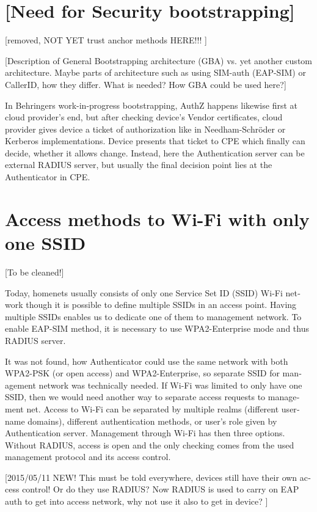 \documentclass[12pt,a4paper,english]{tutthesis}
\begin{document}
\begin{otherlanguage}{english}
\section{[Need for Security bootstrapping]}
\label{sec-4-4}
[removed, NOT YET trust anchor methods HERE!!! ]



[Description of General Bootstrapping architecture (GBA) vs. yet
another custom architecture. Maybe parts of architecture
such as using SIM-auth (EAP-SIM) or CallerID, how they differ. 
What is needed? How GBA could be used here?]


In Behringers work-in-progress  bootstrapping\cite{draft-behringer-bootstrap},
AuthZ happens likewise first at cloud provider's
end, but after checking device's Vendor certificates, cloud provider
gives device a ticket of authorization like in Needham-Schröder or
Kerberos implementations. Device presents that ticket to CPE which
finally can decide, whether it allows change. 
Instead, here the Authentication server can be external RADIUS server,
but usually the final decision point lies at the Authenticator in CPE.


\section{Access methods to Wi-Fi with only one SSID}
\label{sec-4-5}

[To be cleaned!]

Today, homenets usually consists of only one Service Set ID (SSID)
Wi-Fi network though it is possible to define multiple SSIDs in
an access point. Having multiple SSIDs enables us to dedicate one of them
to management network. 
To enable EAP-SIM method, it is necessary to use WPA2-Enterprise mode
and thus RADIUS server.

It was not found, how Authenticator could use the same network with
both WPA2-PSK (or open access) and WPA2-Enterprise, so
separate SSID for management network was technically needed.
If Wi-Fi was limited to only have one SSID, then we would need another
way to separate access requests to management net.  Access to Wi-Fi
can be separated by multiple realms (different username domains),
different authentication methods, or user's role
given by Authentication server. Management through Wi-Fi has then three
options.  Without RADIUS, access is open and the only checking comes
from the used management protocol and its access control.

[2015/05/11 NEW! This must be told everywhere, devices still have their own access
control! Or do they use RADIUS? Now RADIUS is used to carry on EAP auth to get into access
network, why not use it also to get in device? ]


\end{otherlanguage}
\end{document}
